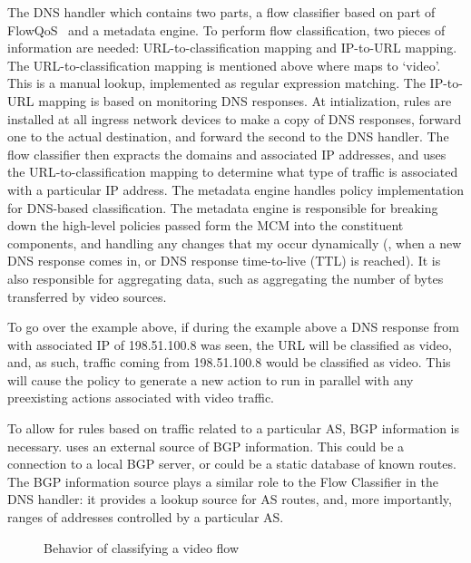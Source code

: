 The DNS handler which contains two parts, a flow classifier based on part of FlowQoS~\cite{FlowQoS} and a metadata engine. To perform flow classification, two pieces of information are needed: URL-to-classification mapping and IP-to-URL mapping. The URL-to-classification mapping is mentioned above where  maps to `video'. This is a manual lookup, implemented as regular expression matching. The IP-to-URL mapping is based on monitoring DNS responses. At intialization, rules are installed at all ingress network devices to make a copy of DNS responses, forward one to the actual destination, and forward the second to the DNS handler. The flow classifier then expracts the domains and associated IP addresses, and uses the URL-to-classification mapping to determine what type of traffic is associated with a particular IP address. 
The metadata engine handles policy implementation for DNS-based classification. The metadata engine is responsible for breaking down the high-level policies passed form the MCM into the constituent components, and handling any changes that my occur dynamically (\ie{}, when a new DNS response comes in, or DNS response time-to-live (TTL) is reached). It is also responsible for aggregating data, such as aggregating the number of bytes transferred by video sources.

To go over the example above, if during the example above a DNS response from  with associated IP of 198.51.100.8 was seen, the URL will be classified as video, and, as such, traffic coming from 198.51.100.8 would be classified as video. This will cause the  policy to generate a new  action to run in parallel with any preexisting actions associated with video traffic. 

To allow for rules based on traffic related to a particular AS, BGP information is necessary. \system{} uses an external source of BGP information. This could be a connection to a local BGP server, or could be a static database of known routes. The BGP information source plays a similar role to the Flow Classifier in the DNS handler: it provides a lookup source for AS routes, and, more importantly, ranges of addresses controlled by a particular AS.



\begin{figure}
    \centering
    \caption{Behavior of \system{} classifying a video flow}
    \label{fig:flow}
\end{figure}


